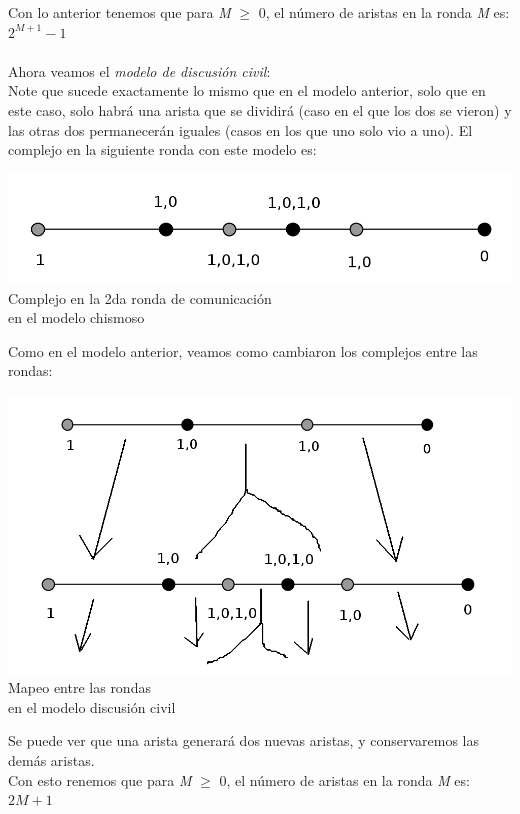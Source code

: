 \documentclass{article}
\begin{document}
\begin{enumerate}
{\begin{enumerate}
        Con lo anterior tenemos que para \textit{M} $≥$ 0, el número de aristas en la ronda
        \textit{M} es: $2^{M + 1}-1$\\\\
        Ahora veamos el \textit{modelo de discusión civil}:\\
        Note que sucede exactamente lo mismo que en el modelo anterior, solo que en este caso,
        solo habrá una arista que se dividirá (caso en el que los dos se vieron) y las otras dos
        permanecerán iguales (casos en los que uno solo vio a uno).
        El complejo en la siguiente ronda con este modelo es:
        \begin{center}
        \includegraphics[scale=0.95]{srondacivil1a.png}\\
        \scriptsize{Complejo en la 2da ronda de comunicación\\en el modelo chismoso}\\
        \end{center}
        Como en el modelo anterior, veamos como cambiaron los complejos entre las rondas:
        \begin{center}
        \includegraphics[scale=0.2]{cambiosrondascivil1a.png}\\
        \scriptsize{Mapeo entre las rondas\\en el modelo discusión civil}\\
        \end{center}
        Se puede ver que una arista generará dos nuevas aristas, y conservaremos
        las demás aristas.\\
        Con esto renemos que para \textit{M} $≥$ 0, el número de aristas en la ronda
        \textit{M} es: $2M + 1$\\


\end{enumerate}}
\end{enumerate}
\end{document}
